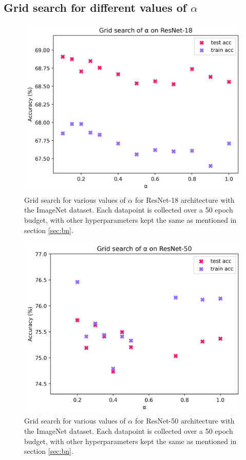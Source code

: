 \documentclass[runningheads]{llncs}
\begin{document}
\clearpage

\subsection{Grid search for different values of $\alpha$}


\begin{figure}[ht]
\centering
\includegraphics[width=0.5\columnwidth]{r18_grid_search}
\caption{ Grid search for various values of $\alpha$ for ResNet-18 architecture with the
ImageNet dataset. Each datapoint is collected over a 50 epoch budget, with other
hyperparameters kept the same as mentioned in section \ref{sec:bn}. }
\label{fig:grid_searcha}
\end{figure}


\begin{figure}[ht]
\centering
\includegraphics[width=0.5\columnwidth]{r50_grid_search}
\caption{ Grid search for various values of $\alpha$ for ResNet-50 architecture with the
ImageNet dataset. Each datapoint is collected over a 50 epoch budget, with other
hyperparameters kept the same as mentioned in section \ref{sec:bn}. }
\label{fig:grid_searchb}
\end{figure}


\clearpage
\end{document}

